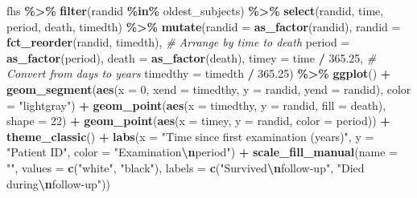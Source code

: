 \documentclass[
]{book}
\newenvironment{Shaded}{\begin{snugshade}}{\end{snugshade}}
\newcommand{\AttributeTok}[1]{\textcolor[rgb]{0.13,0.29,0.53}{#1}}
\newcommand{\CommentTok}[1]{\textcolor[rgb]{0.56,0.35,0.01}{\textit{#1}}}
\newcommand{\DecValTok}[1]{\textcolor[rgb]{0.00,0.00,0.81}{#1}}
\newcommand{\FloatTok}[1]{\textcolor[rgb]{0.00,0.00,0.81}{#1}}
\newcommand{\FunctionTok}[1]{\textcolor[rgb]{0.13,0.29,0.53}{\textbf{#1}}}
\newcommand{\NormalTok}[1]{#1}
\newcommand{\SpecialCharTok}[1]{\textcolor[rgb]{0.81,0.36,0.00}{\textbf{#1}}}
\newcommand{\StringTok}[1]{\textcolor[rgb]{0.31,0.60,0.02}{#1}}
\begin{document}
\begin{Shaded}
\begin{Highlighting}[]
\NormalTok{fhs }\SpecialCharTok{\%\textgreater{}\%} 
  \FunctionTok{filter}\NormalTok{(randid }\SpecialCharTok{\%in\%}\NormalTok{ oldest\_subjects) }\SpecialCharTok{\%\textgreater{}\%} 
  \FunctionTok{select}\NormalTok{(randid, time, period, death, timedth) }\SpecialCharTok{\%\textgreater{}\%} 
  \FunctionTok{mutate}\NormalTok{(}\AttributeTok{randid =} \FunctionTok{as\_factor}\NormalTok{(randid), }
         \AttributeTok{randid =} \FunctionTok{fct\_reorder}\NormalTok{(randid, timedth),  }\CommentTok{\# Arrange by time to death}
         \AttributeTok{period =} \FunctionTok{as\_factor}\NormalTok{(period),}
         \AttributeTok{death =} \FunctionTok{as\_factor}\NormalTok{(death),}
         \AttributeTok{timey =}\NormalTok{ time }\SpecialCharTok{/} \FloatTok{365.25}\NormalTok{,                  }\CommentTok{\# Convert from days to years}
         \AttributeTok{timedthy =}\NormalTok{ timedth }\SpecialCharTok{/} \FloatTok{365.25}\NormalTok{) }\SpecialCharTok{\%\textgreater{}\%} 
  \FunctionTok{ggplot}\NormalTok{() }\SpecialCharTok{+} 
  \FunctionTok{geom\_segment}\NormalTok{(}\FunctionTok{aes}\NormalTok{(}\AttributeTok{x =} \DecValTok{0}\NormalTok{, }\AttributeTok{xend =}\NormalTok{ timedthy, }
                   \AttributeTok{y =}\NormalTok{ randid, }\AttributeTok{yend =}\NormalTok{ randid), }\AttributeTok{color =} \StringTok{"lightgray"}\NormalTok{) }\SpecialCharTok{+} 
  \FunctionTok{geom\_point}\NormalTok{(}\FunctionTok{aes}\NormalTok{(}\AttributeTok{x =}\NormalTok{ timedthy, }\AttributeTok{y =}\NormalTok{ randid, }\AttributeTok{fill =}\NormalTok{ death), }\AttributeTok{shape =} \DecValTok{22}\NormalTok{) }\SpecialCharTok{+} 
  \FunctionTok{geom\_point}\NormalTok{(}\FunctionTok{aes}\NormalTok{(}\AttributeTok{x =}\NormalTok{ timey, }\AttributeTok{y =}\NormalTok{ randid, }\AttributeTok{color =}\NormalTok{ period)) }\SpecialCharTok{+} 
  \FunctionTok{theme\_classic}\NormalTok{() }\SpecialCharTok{+} 
  \FunctionTok{labs}\NormalTok{(}\AttributeTok{x =} \StringTok{"Time since first examination (years)"}\NormalTok{, }
       \AttributeTok{y =} \StringTok{"Patient ID"}\NormalTok{, }
       \AttributeTok{color =} \StringTok{"Examination}\SpecialCharTok{\textbackslash{}n}\StringTok{period"}\NormalTok{) }\SpecialCharTok{+}
  \FunctionTok{scale\_fill\_manual}\NormalTok{(}\AttributeTok{name =} \StringTok{""}\NormalTok{, }\AttributeTok{values =} \FunctionTok{c}\NormalTok{(}\StringTok{"white"}\NormalTok{, }\StringTok{"black"}\NormalTok{), }
                    \AttributeTok{labels =} \FunctionTok{c}\NormalTok{(}\StringTok{"Survived}\SpecialCharTok{\textbackslash{}n}\StringTok{follow{-}up"}\NormalTok{, }\StringTok{"Died during}\SpecialCharTok{\textbackslash{}n}\StringTok{follow{-}up"}\NormalTok{))}
\end{Highlighting}
\end{Shaded}
\end{document}
